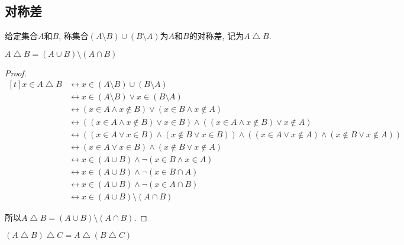 \subsection{对称差}
\begin{definition}
	给定集合$A$和$B$, 称集合$(A\setminus B)\cup (B\setminus A)$为$A$和$B$的对称差, 记为$A\bigtriangleup B$.
\end{definition}

\begin{proposition}
	$A\bigtriangleup B=(A\cup B)\setminus (A\cap B)$
\end{proposition}

\begin{proof}
	$\begin{aligned}[t]
		x\in A\bigtriangleup B & \leftrightarrow x\in (A\setminus B)\cup(B\setminus A) \\
		& \leftrightarrow x\in (A\setminus B)\vee x\in (B\setminus A) \\
		& \leftrightarrow (x\in A\wedge x\notin B)\vee (x\in B\wedge x\notin A) \\
		& \leftrightarrow ((x\in A\wedge x\notin B)\vee x\in B)\wedge ((x\in A\wedge x\notin B)\vee x\notin A) \\
		& \leftrightarrow ((x\in A\vee x\in B)\wedge (x\notin B\vee x\in B))\wedge ((x\in A\vee x\notin A)\wedge (x\notin B\vee x\notin A)) \\
		& \leftrightarrow (x\in A\vee x\in B)\wedge (x\notin B\vee x\notin A) \\
		& \leftrightarrow x\in (A\cup B)\wedge \neg (x\in B\wedge x\in A) \\
		& \leftrightarrow x\in (A\cup B)\wedge \neg (x\in B\cap A) \\
		& \leftrightarrow x\in (A\cup B)\wedge \neg (x\in A\cap B) \\
		& \leftrightarrow x\in (A\cup B)\setminus (A\cap B)
	\end{aligned}$

	所以$A\bigtriangleup B=(A\cup B)\setminus (A\cap B)$.
\end{proof}

\begin{proposition}
	$(A\bigtriangleup B)\bigtriangleup C=A\bigtriangleup (B\bigtriangleup C)$
\end{proposition}

